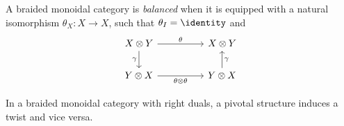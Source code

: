 \documentclass{article}
\begin{document}
\begin{definition}
  A braided monoidal category is \emph{balanced} when it is equipped with a natural
  isomorphism $\theta_X:X\to X$, such that $\theta_I = \identity$ and
  \begin{equation}
    \begin{tikzcd}
      {X\otimes Y} && {X\otimes Y} \\
      {Y\otimes X} && {Y\otimes X}
      \arrow["\gamma"', from=1-1, to=2-1]
      \arrow["\gamma"', from=2-3, to=1-3]
      \arrow["\theta\otimes\theta"', from=2-1, to=2-3]
      \arrow["\theta", from=1-1, to=1-3]
    \end{tikzcd}
  \end{equation}
\end{definition}

\begin{theorem}
  In a braided monoidal category with right duals, a pivotal structure induces a twist and
  vice versa.
\end{theorem}
\end{document}
